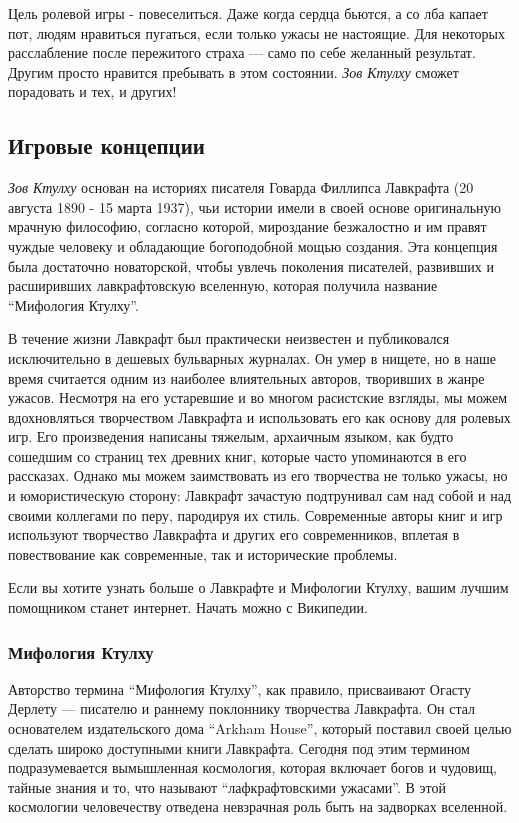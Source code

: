 \documentclass[letterpaper,twocolumn,openany, twoside, 11pt, usenames]{cocbook}
\begin{document}
Цель ролевой игры - повеселиться. Даже когда сердца бьются, а со лба капает пот, людям нравиться пугаться, если только ужасы не настоящие. Для некоторых расслабление после пережитого страха --- само по себе желанный результат. Другим просто нравится пребывать в этом состоянии. {\it Зов Ктулху} сможет порадовать и тех, и других!

\subsection*{\nohyphens{Игровые концепции}}

{\it Зов Ктулху} основан на историях писателя Говарда Филлипса Лавкрафта (20 августа 1890 - 15 марта 1937), чьи истории имели в своей основе оригинальную мрачную философию, согласно которой, мироздание безжалостно и им правят чуждые  человеку и обладающие богоподобной мощью создания. Эта концепция была достаточно новаторской, чтобы увлечь поколения писателей, развивших и расширивших лавкрафтовскую вселенную, которая получила название ``Мифология Ктулху''.

В течение жизни Лавкрафт был практически неизвестен и публиковался исключительно в дешевых бульварных журналах. Он умер в нищете, но в наше время считается одним из наиболее влиятельных авторов, творивших в жанре ужасов. Несмотря на его устаревшие и во многом расистские взгляды, мы можем вдохновляться творчеством Лавкрафта и использовать его как основу для ролевых игр. Его произведения написаны тяжелым, архаичным языком, как будто сошедшим со страниц тех древних книг, которые часто упоминаются в его рассказах. Однако мы можем заимствовать из его творчества не только ужасы, но и юмористическую сторону: Лавкрафт зачастую подтрунивал сам над собой и над своими коллегами по перу, пародируя их стиль. Современные авторы книг и игр используют творчество Лавкрафта и других его современников, вплетая в повествование как современные, так и исторические проблемы.

Если вы хотите узнать больше о Лавкрафте и Мифологии Ктулху, вашим лучшим помощником станет интернет. Начать можно с Википедии.

\subsubsection*{\nohyphens{Мифология Ктулху}}

Авторство термина ``Мифология Ктулху'', как правило, присваивают Огасту Дерлету --- писателю и раннему поклоннику творчества Лавкрафта. Он стал основателем издательского дома ``Arkham House'', который поставил своей целью сделать широко доступными книги Лавкрафта. Сегодня под этим термином подразумевается вымышленная космология, которая включает богов и чудовищ, тайные знания и то, что называют ``лафкрафтовскими ужасами''. В этой космологии человечеству отведена невзрачная роль быть на задворках вселенной.
\end{document}

